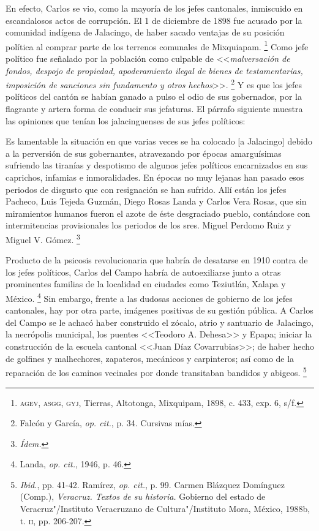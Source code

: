 \documentclass[14pt,twoside,final]{extbook} %
\let\oldfootnote\footnote
\renewcommand\footnote[1]{%
\oldfootnote{\hspace{1mm}#1}}
\begin{document}
En efecto, Carlos se vio, como la mayoría de los jefes cantonales, inmiscuido en escandalosos actos de corrupción. El 1 de diciembre de 1898 fue acusado por la comunidad indígena de Jalacingo, de haber sacado ventajas de su posición política al comprar parte de los terrenos comunales de Mixquiapam.\footnote{\textsc{agev, asgg, gyj}, Tierras, Altotonga, Mixquipam, 1898, c. 433, exp. 6, s/f.} Como jefe político fue señalado por la población como culpable de <<\emph{malversación de fondos, despojo de propiedad, apoderamiento ilegal de bienes de testamentarias, imposición de sanciones sin fundamento y otros hechos}>>.\footnote{Falcón y García, \emph{op. cit.}, p. 34. Cursivas mías.} Y es que los jefes políticos del cantón se habían ganado a pulso el odio de sus gobernados, por la flagrante y artera forma de conducir sus jefaturas. El párrafo siguiente muestra las opiniones que tenían los jalacinguenses de sus jefes políticos:
\begin{quoting}
Es lamentable la situación en que varias veces se ha colocado [a Jalacingo] debido a la perversión de sus gobernantes, atravezando por épocas amarguísimas sufriendo las tiranías y despotismo de algunos jefes políticos encarnizados en sus caprichos, infamias e inmoralidades. En épocas no muy lejanas han pasado esos periodos de disgusto que con resignación se han sufrido. Allí están los jefes Pacheco, Luis Tejeda Guzmán, Diego Rosas Landa y Carlos Vera Rosas, que sin miramientos humanos fueron el azote de éste desgraciado pueblo, contándose con intermitencias provisionales los periodos de los sres. Miguel Perdomo Ruiz y Miguel V. Gómez.\footnote{\em Ídem.}
\end{quoting}
Producto de la psicosis revolucionaria que habría de desatarse en 1910 contra de los jefes políticos, Carlos del Campo habría de autoexiliarse junto a otras prominentes familias de la localidad en ciudades como Teziutlán, Xalapa y México.\footnote{Landa, \emph{op. cit.}, 1946, p. 46.} Sin embargo, frente a las dudosas acciones de gobierno de los jefes cantonales, hay por otra parte, imágenes positivas de su gestión pública. A Carlos del Campo se le achacó haber construido el zócalo, atrio y santuario de Jalacingo, la necrópolis municipal, los puentes <<Teodoro A. Dehesa>> y Epapa; iniciar la construcción de la escuela cantonal <<Juan Díaz Covarrubias>>; de haber hecho de golfines y malhechores, zapateros, mecánicos y carpinteros; así como de la reparación de los caminos vecinales por donde transitaban bandidos y abigeos.\footnote{\emph{Ibid.}, pp. 41-42. Ramírez, \emph{op. cit.}, p. 99. Carmen Blázquez Domínguez (Comp.), \emph{Veracruz. Textos de su historia.} Gobierno del estado de Veracruz"/Instituto Veracruzano de Cultura"/Instituto Mora, México, 1988b, t. \textsc{ii}, pp. 206-207.} \pagebreak[4]
\end{document}
